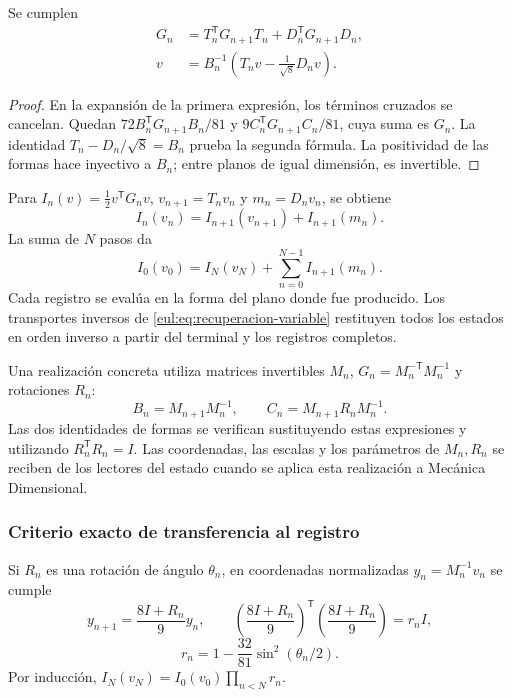 \begin{teorema}
\label{eul:teo:forma-variable}
Se cumplen
\begin{align}
 G_n&=T_n^\mathsf TG_{n+1}T_n+D_n^\mathsf TG_{n+1}D_n,
 \label{eul:eq:balance-variable}\\
 v&=B_n^{-1}\left(T_nv-\frac1{\sqrt8}D_nv\right).
 \label{eul:eq:recuperacion-variable}
\end{align}
\end{teorema}
\begin{proof}
En la expansión de la primera expresión, los términos cruzados se
cancelan. Quedan \(72B_n^\mathsf TG_{n+1}B_n/81\) y
\(9C_n^\mathsf TG_{n+1}C_n/81\), cuya suma es \(G_n\).
La identidad \(T_n-D_n/\sqrt8=B_n\) prueba la segunda fórmula.
La positividad de las formas hace inyectivo a \(B_n\); entre planos
de igual dimensión, es invertible.
\end{proof}

Para \(I_n(v)=\tfrac12v^\mathsf TG_nv\),
\(v_{n+1}=T_nv_n\) y \(m_n=D_nv_n\), se obtiene
\[
 I_n(v_n)=I_{n+1}(v_{n+1})+I_{n+1}(m_n).
\]
La suma de \(N\) pasos da
\begin{equation}
 I_0(v_0)=I_N(v_N)+\sum_{n=0}^{N-1}I_{n+1}(m_n).
\label{eul:eq:telescopica}
\end{equation}
Cada registro se evalúa en la forma del plano donde fue producido.
Los transportes inversos de \eqref{eul:eq:recuperacion-variable}
restituyen todos los estados en orden inverso a partir del terminal y
los registros completos.

Una realización concreta utiliza matrices invertibles \(M_n\),
\(G_n=M_n^{-\mathsf T}M_n^{-1}\) y rotaciones \(R_n\):
\[
 B_n=M_{n+1}M_n^{-1},\qquad
 C_n=M_{n+1}R_nM_n^{-1}.
\]
Las dos identidades de formas se verifican sustituyendo estas
expresiones y utilizando \(R_n^\mathsf TR_n=I\). Las coordenadas,
las escalas y los parámetros de \(M_n,R_n\) se reciben de los lectores
del estado cuando se aplica esta realización a Mecánica Dimensional.

\subsubsection{Criterio exacto de transferencia al registro}

Si \(R_n\) es una rotación de ángulo \(\theta_n\), en coordenadas
normalizadas \(y_n=M_n^{-1}v_n\) se cumple
\[
 y_{n+1}=\frac{8I+R_n}{9}y_n,
 \qquad
 \left(\frac{8I+R_n}{9}\right)^\mathsf T
 \left(\frac{8I+R_n}{9}\right)=r_nI,
\]
\[
 r_n=1-\frac{32}{81}\sin^2(\theta_n/2).
\]
Por inducción,
\(I_N(v_N)=I_0(v_0)\prod_{n<N}r_n\).

